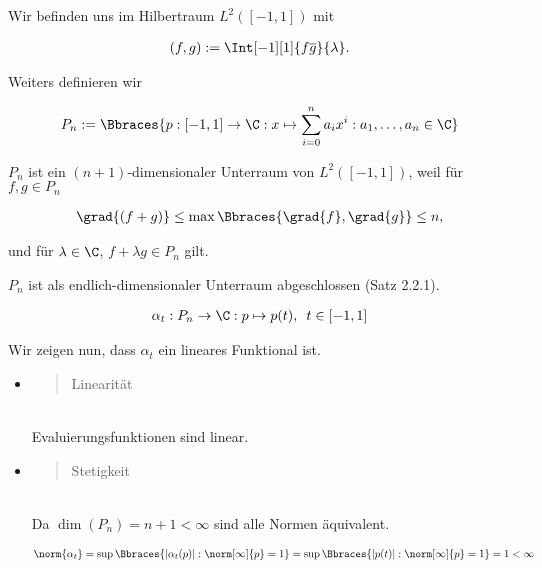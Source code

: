 \begin{solution}

Wir befinden uns im Hilbertraum $L^2([-1, 1])$ mit

\begin{align*}
  (f, g) := \Int[-1][1]{f \overline{g}}{\lambda}.
\end{align*}

Weiters definieren wir

\begin{align*}
  P_n := \Bbraces
  {
    p: [-1, 1] \to \C: x
    \mapsto \sum_{i=0}^n a_i x^i:
    a_1, \ldots, a_n \in \C
  }
\end{align*}

$P_n$ ist ein $(n+1)$-dimensionaler Unterraum von $L^2([-1, 1])$, weil für $f, g \in P_n$

\begin{align*}
  \grad{(f + g)}
  \leq
  \max \Bbraces{\grad{f}, \grad{g}}
  \leq n,
\end{align*}

und für $\lambda \in \C$, $f + \lambda g \in P_n$ gilt.


$P_n$ ist als endlich-dimensionaler Unterraum abgeschlossen (Satz 2.2.1).

\begin{align*}
  \alpha_t:
  P_n \to \C:
  p  \mapsto p(t),
  \enspace
  t \in [-1, 1]
\end{align*}

Wir zeigen nun, dass $\alpha_t$ ein lineares Funktional ist.

\begin{itemize}

  \item
  \blockquote{Linearität}: \\

  Evaluierungsfunktionen sind linear.

  \item
  \blockquote{Stetigkeit}: \\

  Da $\dim(P_n) = n + 1 < \infty$ sind alle Normen äquivalent.

  \begin{align*}
    \norm{\alpha_t}
    =
    \sup \Bbraces
    {
      |\alpha_t(p)|:
      \norm[\infty]{p} = 1
    }
    =
    \sup \Bbraces
    {
      |p(t)|:
      \norm[\infty]{p} = 1
    }
    = 1 < \infty
  \end{align*}


\end{itemize}
\end{solution}
